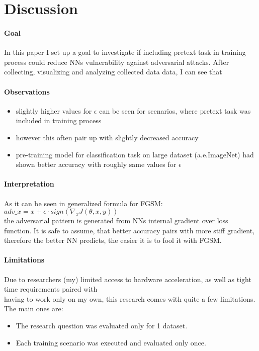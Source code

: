 \section{Discussion}

\paragraph{Goal}
In this paper I set up a goal to investigate if including pretext task in training process could reduce NNs
vulnerability against adversarial attacks.
After collecting, visualizing and analyzing collected data data, I can see that

\paragraph{Observations}
\begin{itemize}
    \item slightly higher values for $\epsilon$ can be seen for scenarios, where pretext task was included in training process
    \item however this often pair up with slightly decreased accuracy
    \item pre-training model for classification task on large dataset (a.e.ImageNet)
    had shown better accuracy with roughly same values for $\epsilon$
\end{itemize}


\paragraph{Interpretation}
As it can be seen in generalized formula for FGSM:
\\
$adv\_x = x + \epsilon \cdot sign(\nabla_x J(\theta, x, y))$
\\
the adversarial pattern is generated from NNs internal gradient over loss function.
It is safe to assume, that better accuracy pairs with more stiff gradient, therefore the better NN predicts,
the easier it is to fool it with FGSM.


\paragraph{Limitations}
Due to researchers (my) limited access to hardware acceleration, as well as tight time requirements paired with
\\ having to work only on my own, this research comes with quite a few limitations.
The main ones are:
\begin{itemize}
    \item The research question was evaluated only for 1 dataset.
    \item Each training scenario was executed and evaluated only once.
\end{itemize}


